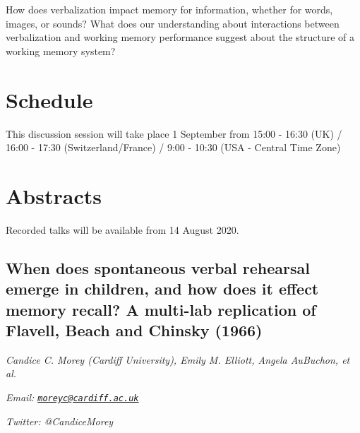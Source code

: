 \documentclass[
  12pt,
]{book}
\begin{document}
How does verbalization impact memory for information, whether for words, images, or sounds? What does our understanding about interactions between verbalization and working memory performance suggest about the structure of a working memory system?

\hypertarget{schedule-1}{%
\section{Schedule}\label{schedule-1}}

This discussion session will take place 1 September from 15:00 - 16:30 (UK) / 16:00 - 17:30 (Switzerland/France) / 9:00 - 10:30 (USA - Central Time Zone)

\hypertarget{abstracts-1}{%
\section{Abstracts}\label{abstracts-1}}

Recorded talks will be available from 14 August 2020.

\hypertarget{when-does-spontaneous-verbal-rehearsal-emerge-in-children-and-how-does-it-effect-memory-recall-a-multi-lab-replication-of-flavell-beach-and-chinsky-1966}{%
\subsection{When does spontaneous verbal rehearsal emerge in children, and how does it effect memory recall? A multi-lab replication of Flavell, Beach and Chinsky (1966)}\label{when-does-spontaneous-verbal-rehearsal-emerge-in-children-and-how-does-it-effect-memory-recall-a-multi-lab-replication-of-flavell-beach-and-chinsky-1966}}

\emph{Candice C. Morey (Cardiff University), Emily M. Elliott, Angela AuBuchon, et al.}

\emph{Email: \href{mailto:moreyc@cardiff.ac.uk}{\nolinkurl{moreyc@cardiff.ac.uk}}}

\emph{Twitter: @CandiceMorey}
\end{document}
